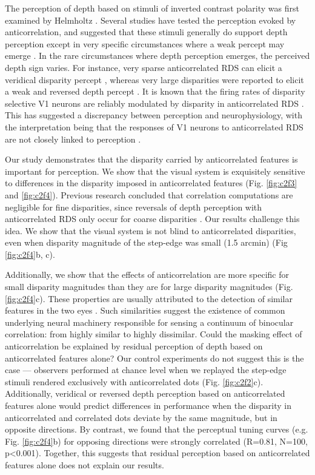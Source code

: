 The perception of depth based on stimuli of inverted contrast polarity was first examined by Helmholtz \cite{helmholtz1909physiological}. Several studies have tested the perception evoked by anticorrelation, and suggested that these stimuli generally do support depth perception \cite{BLTJ:BLTJ3954} except in very specific circumstances where a weak percept may emerge \cite{JULESZ:1964ff,Cogan:1993yr,Cumming:1998ib,Read:2000kx,Hibbard2014}. In the rare circumstances where depth perception emerges, the perceived depth sign varies. For instance, very sparse anticorrelated RDS can elicit a veridical disparity percept \cite{Cogan:1993yr,Cumming:1998ib}, whereas very large disparities were reported to elicit a weak and reversed depth percept \cite{Doi:2011ku}. It is known that the firing rates of disparity selective V1 neurons are reliably modulated by disparity in anticorrelated RDS \cite{Cumming:1997ve,Samonds:2013cs}. This has suggested a discrepancy between perception and neurophysiology, with the interpretation being that the responses of V1 neurons to anticorrelated RDS are not closely linked to perception \cite{Cumming:1998ib}.

Our study demonstrates that the disparity carried by anticorrelated features is important for perception. We show that the visual system is exquisitely sensitive to differences in the disparity imposed in anticorrelated features (Fig. \ref{fig:c2f3} and \ref{fig:c2f4}). Previous research concluded that correlation computations are negligible for fine disparities, since reversals of depth perception with anticorrelated RDS only occur for coarse disparities \cite{Doi:2011ku}. Our results challenge this idea. We show that the visual system is not blind to anticorrelated disparities, even when disparity magnitude of the step-edge was small (1.5 arcmin) (Fig \ref{fig:c2f4}b, c).

Additionally, we show that the effects of anticorrelation are more specific for small disparity magnitudes than they are for large disparity magnitudes (Fig. \ref{fig:c2f4}c). These properties are usually attributed to the detection of similar features in the two eyes \cite{Badcock:1985ly,Lehky:1990fk,Stevenson:1992kx}. Such similarities suggest the existence of common underlying neural machinery responsible for sensing a continuum of binocular correlation: from highly similar to highly dissimilar.
Could the masking effect of anticorrelation be explained by residual perception of depth based on anticorrelated features alone? Our control experiments do not suggest this is the case --- observers performed at chance level when we replayed the step-edge stimuli rendered exclusively with anticorrelated dots (Fig. \ref{fig:c2f2}c). Additionally, veridical or reversed depth perception based on anticorrelated features alone would predict differences in performance when the disparity in anticorrelated and correlated dots deviate by the same magnitude, but in opposite directions. By contrast, we found that the perceptual tuning curves (e.g. Fig. \ref{fig:c2f4}b) for opposing directions were strongly correlated (R=0.81, N=100, p<0.001). Together, this suggests that residual perception based on anticorrelated features alone does not explain our results.

